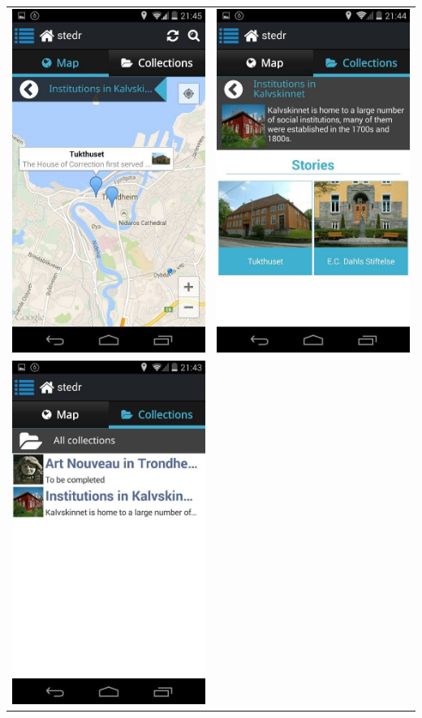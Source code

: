 \documentclass[12pt,a4paper,titlepage]{article}
\begin{document}
\begin{center}
\begin{tabular}{cc}
	 	\includegraphics[width=0.35 \textwidth]{res/ScreenShot1.jpg}	& 	
	 	\includegraphics[width=0.35 \textwidth]{res/ScreenShot2.jpg}\\
	 	\includegraphics[width=0.35 \textwidth]{res/ScreenShot3.jpg}	&

\end{tabular}
\end{center}
\end{document}
